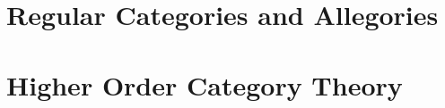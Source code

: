 \documentclass{easychair}
\begin{document}

\section{Regular Categories and Allegories}
\label{sec:allegories}

\section{Higher Order Category Theory}
\label{sec:HO}



\label{sect:bib}

%
%
%





\end{document}
